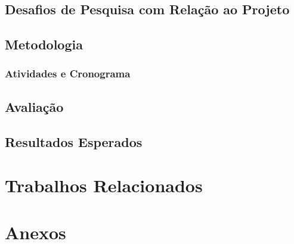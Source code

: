 \documentclass[a4paper,11pt]{article}
\begin{document}
\subsection{Desafios de Pesquisa com Relação ao Projeto}\label{desafios}

\subsection{Metodologia}\label{sec:metodologia}

   
\subsubsection{Atividades e Cronograma}\label{sec:atividadeECronograma}


\subsection{Avaliação}\label{sec:avaliacao}

\subsection{Resultados Esperados}\label{sec:ResultadosEsperados}

\section{Trabalhos Relacionados}\label{sec:relacionados}
 


\singlespacing 



\clearpage

\section{Anexos}\label{anexos}

\label{anexos}

% 


\end{document}
